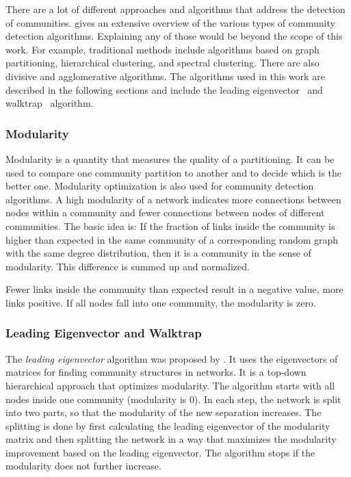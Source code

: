 There are a lot of different approaches and algorithms that address the detection of communities. \textcite{fortunato2010community} gives an extensive overview of the various types of community detection algorithms.
Explaining any of those would be beyond the scope of this work. For example, traditional methods include algorithms based on graph partitioning, hierarchical clustering, and spectral clustering. There are also divisive and agglomerative algorithms.
The algorithms used in this work are described in the following sections and include the leading eigenvector~\cite{newman2006finding} and walktrap~\cite{pons2005computing} algorithm.

\subsubsection{Modularity}
Modularity is a quantity that measures the quality of a partitioning.
It can be used to compare one community partition to another and to decide which is the better one.
Modularity optimization is also used for community detection algorithms.
A high modularity of a network indicates more connections between nodes within a community and fewer connections between nodes of different communities.
The basic idea is: If the fraction of links inside the community is higher than expected in the same community of a corresponding random graph with the same degree distribution, then it is a community in the sense of modularity.
This difference is summed up and normalized.

Fewer links inside the community than expected result in a negative value, more links positive.
If all nodes fall into one community, the modularity is zero.


\subsubsection{Leading Eigenvector and Walktrap}
The \emph{leading eigenvector} algorithm was proposed by \textcite{newman2006finding}.
It uses the eigenvectors of matrices for finding community structures in networks.
It is a top-down hierarchical approach that optimizes modularity.
The algorithm starts with all nodes inside one community (modularity is 0).
In each step, the network is split into two parts, so that the modularity of the new separation increases.
The splitting is done by first calculating the leading eigenvector of the modularity matrix and then splitting the network in a way that maximizes the modularity improvement based on the leading eigenvector.
The algorithm stops if the modularity does not further increase.

